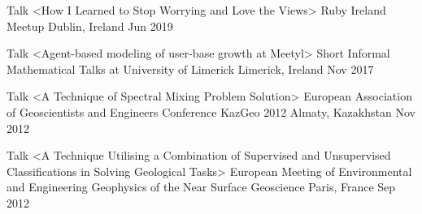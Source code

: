 \vspace{\acvSectionTopSkip}


\begin{cventries}

  \cvtalk
    {Talk <How I Learned to Stop Worrying and Love the Views>} %
    {Ruby Ireland Meetup} %
    {Dublin, Ireland} %
    {Jun 2019} %
    {}

  \cvtalk
    {Talk <Agent-based modeling of user-base growth at Meetyl>} %
    {Short Informal Mathematical Talks at University of Limerick} %
    {Limerick, Ireland} %
    {Nov 2017} %
    {}

  \cvtalk
    {Talk <A Technique of Spectral Mixing Problem Solution>} %
    {European Association of Geoscientists and Engineers Conference KazGeo 2012} %
    {Almaty, Kazakhstan} %
    {Nov 2012} %
    {}

  \cvtalk
    {Talk <A Technique Utilising a Combination of Supervised and Unsupervised Classifications in Solving Geological Tasks>} %
    {European Meeting of Environmental and Engineering Geophysics of the Near Surface Geoscience} %
    {Paris, France} %
    {Sep 2012} %
    {}

\end{cventries}
